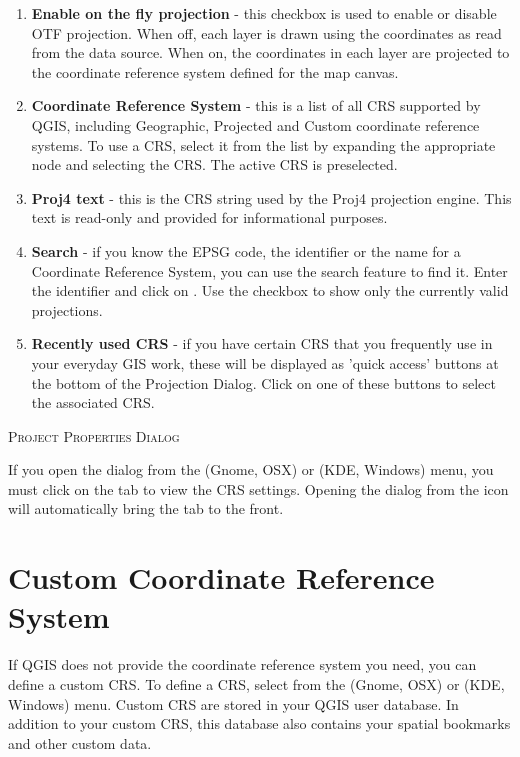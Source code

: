 \begin{enumerate}
\item \textbf{Enable on the fly projection} -
this checkbox is used to enable or disable OTF projection. When off, each
layer is drawn using the coordinates as read from the data source. When on,
the coordinates in each layer are projected to the coordinate reference
system defined for the map canvas.
\item \textbf{Coordinate Reference System} - this is a list of all CRS
supported by QGIS, including Geographic, Projected and Custom coordinate
reference systems. To use a CRS, select it from the list by expanding
the appropriate node and selecting the CRS. The active CRS is preselected.
\item \textbf{Proj4 text} - this is the CRS string used by the Proj4
projection engine. This text is read-only and provided for informational
purposes.
\item \textbf{Search} - if you know the EPSG code, the identifier or the name 
for a Coordinate Reference System, you can use the search feature to find it.
Enter the identifier and click on . Use the  checkbox to show only the currently valid projections. 
\item \textbf{Recently used CRS} - if you have certain CRS that you frequently 
use in your everyday GIS work, these will be displayed as 'quick access' buttons 
at the bottom of the Projection Dialog. Click on one of these buttons to select 
the associated CRS.
\end{enumerate}

\begin{Tip}
\caption{\textsc{Project Properties Dialog}}
If you open the  dialog from the
 (Gnome, OSX) or  
(KDE, Windows) menu, you must click on the  tab to view the CRS settings. Opening the dialog from the
 icon will automatically bring
the  tab to the front.
\end{Tip}

\section{Custom Coordinate Reference System}\label{sec:customprojections}

If QGIS does not provide the coordinate reference system you need, you
can define a custom CRS. To define a CRS, select
 from the  
(Gnome, OSX) or  (KDE, Windows) menu.
Custom CRS are stored in your QGIS user database. In addition to your custom
CRS, this database also contains your spatial bookmarks and other custom data. 

